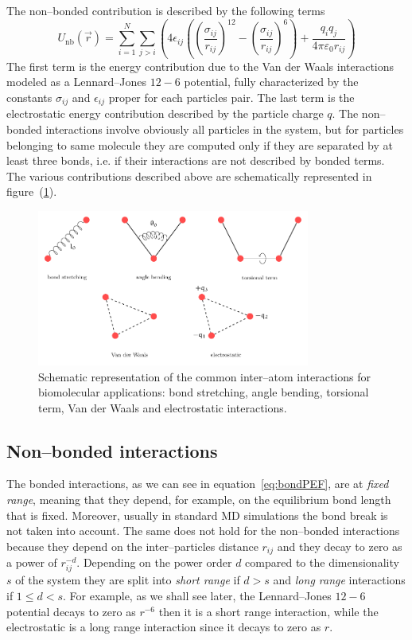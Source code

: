The non--bonded contribution is described by the following terms
\begin{equation}
	U_\text{nb}(\vec r) = \sum_{i=1}^N \sum_{j>i} \left ( {4\epsilon_{ij} \left ( \left ( \frac{\sigma_{ij}}{r_{ij}} \right )^{12} - \left ( \frac{\sigma_{ij}}{r_{ij}} \right )^6 \right )  + \frac{q_iq_j}{4\pi\varepsilon_0 r_{ij}}} \right )
	\label{eq:nonbonPEF}
\end{equation}
The first term is the energy contribution due to the Van der Waals interactions modeled as a Lennard--Jones 
$12-6$ potential, fully characterized by the constants $\sigma_{ij}$ and $\epsilon_{ij}$ proper for each 
particles pair. The last term is the electrostatic energy contribution described by the particle charge $q$. The 
non--bonded interactions involve obviously all particles in the system, but for particles belonging to same 
molecule they are computed only if they are separated by at least three bonds, i.e. if their interactions are not 
described by bonded terms. The various contributions described above are schematically represented in 
figure~(\ref{fig:FFInteraction}).
\begin{figure}[!ht]
	\centering
	\includegraphics[width=0.8\textwidth]{./img/interPartInt/interPartInt}
	\caption{Schematic representation of the common inter--atom interactions for biomolecular applications: bond stretching, angle bending, torsional term, Van der Waals and electrostatic interactions.}
	\label{fig:FFInteraction}
\end{figure}

\subsection{Non--bonded interactions}
\label{sec:nonbonded}
The bonded interactions, as we can see in equation~\eqref{eq:bondPEF}, are at \textit{fixed range}, meaning that 
they depend, for example, on the equilibrium bond length that is fixed. Moreover, usually in standard \ac{MD} 
simulations the bond break is not taken into account. The same does not hold for the non--bonded interactions 
because they depend on the inter--particles distance $r_{ij}$ and they decay to zero as a power of $r_{ij}^{-d}$. 
Depending on the power order $d$ compared to the dimensionality $s$ of the system they are split into 
\textit{short range} if $d>s$ and \textit{long range} interactions if $1 \le d < s$. For example, as we shall see 
later, the Lennard--Jones $12-6$ potential decays to zero as $r^{-6}$ then it is a short range interaction, while 
the electrostatic is a long range interaction since it decays to zero as $r$.

